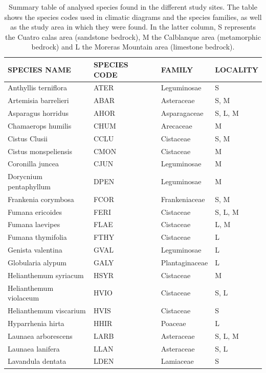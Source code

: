 \documentclass[11pt,twoside]{reedthesis}
\begin{document}
\begin{table}[H]

\caption[Summary table of analysed species found in the different study sites.]{\label{tab:unnamed-chunk-42}Summary table of analysed species found in the different study sites. The table shows the species codes used in climatic diagrams and the species families, as well as the study area in which they were found. In the latter column, S represents the Cuatro calas area (sandstone bedrock), M the Calblanque area (metamorphic bedrock) and L the Moreras Mountain area (limestone bedrock).}
\centering
\fontsize{8}{10}\selectfont
\begin{tabular}[t]{llll}
\toprule
SPECIES NAME & SPECIES CODE & FAMILY & LOCALITY\\
\midrule
Anthyllis terniflora & ATER & Leguminosae & S\\
Artemisia barrelieri & ABAR & Asteraceae & S, M\\
Asparagus horridus & AHOR & Asparagaceae & S, L, M\\
Chamaerops humilis & CHUM & Arecaceae & M\\
Cistus Clusii & CCLU & Cistaceae & S, M\\
Cistus monspeliensis & CMON & Cistaceae & M\\
Coronilla juncea & CJUN & Leguminosae & M\\
Dorycnium pentaphyllum & DPEN & Leguminosae & M\\
Frankenia corymbosa & FCOR & Frankeniaceae & S, M\\
Fumana ericoides & FERI & Cistaceae & S, L, M\\
Fumana laevipes & FLAE & Cistaceae & L, M\\
Fumana thymifolia & FTHY & Cistaceae & L\\
Genista valentina & GVAL & Leguminosae & L\\
Globularia alypum & GALY & Plantaginaceae & L\\
Helianthemum syriacum & HSYR & Cistaceae & M\\
Helianthemum violaceum & HVIO & Cistaceae & S, L\\
Helianthemum viscarium & HVIS & Cistaceae & S\\
Hyparrhenia hirta & HHIR & Poaceae & L\\
Launaea arborescens & LARB & Asteraceae & S, L, M\\
Launaea lanifera & LLAN & Asteraceae & S, L\\
Lavandula dentata & LDEN & Lamiaceae & S\\

\end{tabular}
\end{table}
\end{document}
